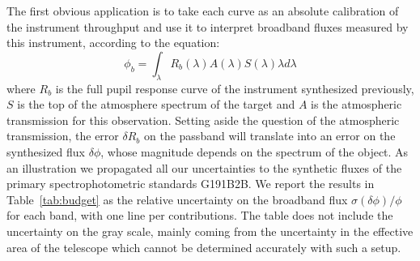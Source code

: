 The first obvious application is to take
each curve as an absolute calibration of the instrument throughput and
use it to interpret broadband fluxes measured by this instrument,
according to the equation:
\begin{equation}
  \label{eq:mb}
  \phi_b = \int_\lambda  R_b(\lambda) A(\lambda) S(\lambda) \lambda d\lambda
\end{equation}
where $R_b$ is the full pupil response curve of the instrument
synthesized previously, $S$ is the top of the atmosphere spectrum of
the target and $A$ is the atmospheric transmission for this
observation. Setting aside the question of the atmospheric
transmission, the error $\delta R_b$ on the passband will translate
into an error on the synthesized flux $\delta \phi$, whose magnitude
depends on the spectrum of the object. As an illustration we
propagated all our uncertainties to the synthetic fluxes of the
primary spectrophotometric standards G191B2B. We report the results in
Table~\ref{tab:budget} as the relative uncertainty on the broadband
flux $\sigma(\delta \phi)/\phi$ for each band, with one line per
contributions. The table does not include the uncertainty on the gray
scale, mainly coming from the uncertainty in the effective area of the
telescope which cannot be determined accurately with such a setup. 

